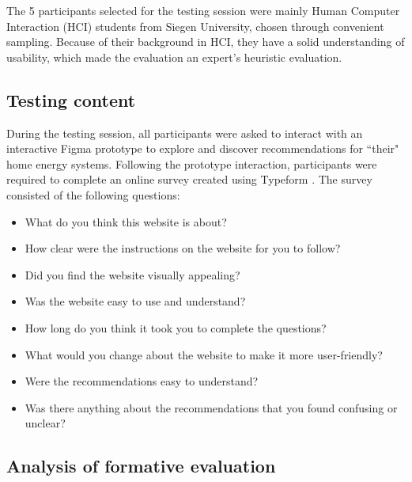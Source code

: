 The 5 participants selected for the testing session were mainly Human Computer Interaction (HCI) students from Siegen University, chosen through convenient sampling. 
Because of their background in HCI, they have a solid understanding of usability, which made the evaluation an expert's heuristic evaluation. 


\subsection{Testing content}

During the testing session, all participants were asked to interact with an interactive Figma prototype to explore and discover recommendations for ``their" home energy systems. 
Following the prototype interaction, participants were required to complete an online survey created using Typeform \cite{typeform}.
The survey consisted of the following questions: 
\begin{itemize}
  \item What do you think this website is about?
  \item How clear were the instructions on the website for you to follow?
  \item Did you find the website visually appealing?
  \item Was the website easy to use and understand?
  \item How long do you think it took you to complete the questions? 
  \item What would you change about the website to make it more user-friendly?
  \item Were the recommendations easy to understand?
  \item Was there anything about the recommendations that you found confusing or unclear?
\end{itemize}


\subsection{Analysis of formative evaluation}

